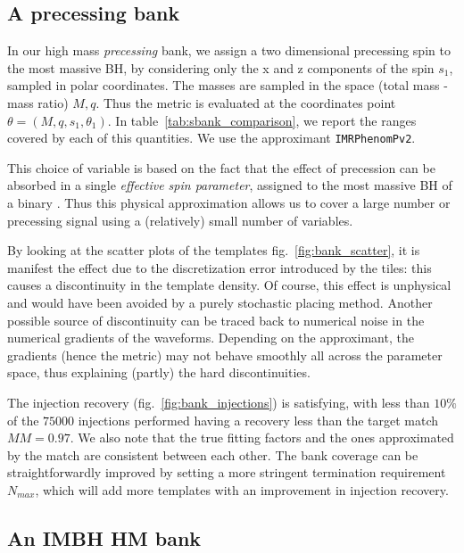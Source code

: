 \documentclass[twocolumn,showpacs,preprintnumbers,nofootinbib,prd,
superscriptaddress,10pt]{revtex4-2}
\begin{document}
\subsection{A precessing bank}\label{sec:precessing_bank}
	
In our high mass {\it precessing} bank, we assign a two dimensional precessing spin to the most massive BH, by considering only the x and z components of the spin $s_1$, sampled in polar coordinates. The masses are sampled in the space (total mass - mass ratio) $M,q$.  Thus the metric is evaluated at the coordinates point $\theta = (M, q, s_1, \theta_1)$. In table~\ref{tab:sbank_comparison}, we report the ranges covered by each of this quantities. We use the approximant \texttt{IMRPhenomPv2}.

This choice of variable is based on the fact that the effect of precession can be absorbed in a single {\it effective spin parameter}, assigned to the most massive BH of a binary \cite{PhysRevD.91.024043, PhysRevD.103.083022}. Thus this physical approximation allows us to cover a large number or precessing signal using a (relatively) small number of variables.

By looking at the scatter plots of the templates fig.~\ref{fig:bank_scatter}, it is manifest the effect due to the discretization error introduced by the tiles: this causes a discontinuity in the template density. Of course, this effect is unphysical and would have been avoided by a purely stochastic placing method.
Another possible source of discontinuity can be traced back to numerical noise in the numerical gradients of the waveforms. Depending on the approximant, the gradients (hence the metric) may not behave smoothly all across the parameter space, thus explaining (partly) the hard discontinuities.

The injection recovery (fig.~\ref{fig:bank_injections}) is satisfying, with less than $10\%$ of the $75000$ injections performed having a recovery less than the target match $MM = 0.97$.
We also note that the true fitting factors and the ones approximated by the match are consistent between each other.
The bank coverage can be straightforwardly improved by setting a more stringent termination requirement $N_{max}$, which will add more templates with an improvement in injection recovery.

\subsection{An IMBH HM bank}\label{sec:HM_bank}
\end{document}

